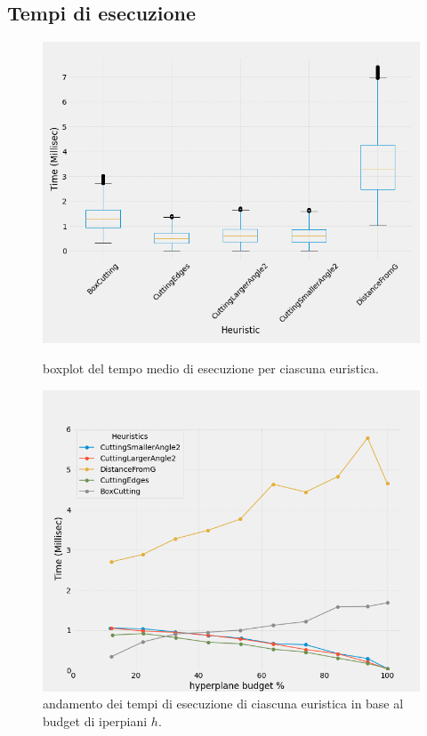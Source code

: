 \subsection*{Tempi di esecuzione}

\begin{figure}[H]
    \centering
    \begin{minipage}[b]{0.45\textwidth}
        \centering
        \includegraphics[width=\textwidth]{media/report/bxplt_time.png}
        \caption{boxplot del tempo medio di esecuzione per ciascuna euristica.\\
        }
    \end{minipage}
    \hspace{0.05\textwidth}
    \begin{minipage}[b]{0.45\textwidth}
        \centering
        \includegraphics[width=\textwidth]{media/report/Time_plot.png}
        \caption{andamento dei tempi di esecuzione di ciascuna euristica in base al budget di iperpiani $h$.}
        \label{fig: time_h}
    \end{minipage}
\end{figure}

